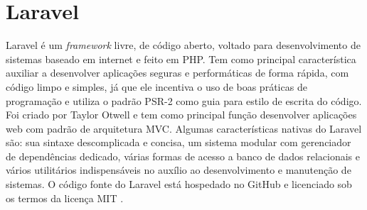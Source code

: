 \section{Laravel}


Laravel é um \textit{framework} livre, de código aberto, voltado para desenvolvimento de sistemas baseado em internet e feito em PHP. Tem como principal característica auxiliar a desenvolver aplicações seguras e performáticas de forma rápida, com código limpo e simples, já que ele incentiva o uso de boas práticas de programação e utiliza o padrão PSR-2 como guia para estilo de escrita do código. Foi criado por Taylor Otwell e tem como principal função desenvolver aplicações web com padrão de arquitetura MVC. Algumas características nativas do Laravel são: sua sintaxe descomplicada e concisa, um sistema modular com gerenciador de dependências dedicado, várias formas de acesso a banco de dados relacionais e vários utilitários indispensáveis no auxílio ao desenvolvimento e manutenção de sistemas. O código fonte do Laravel está hospedado no GitHub e licenciado sob os termos da licença MIT \cite{portalgsti:laravel}. 


